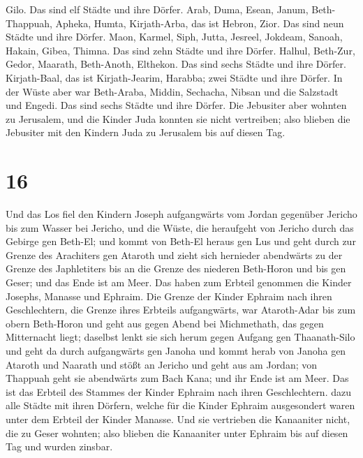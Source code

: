 Gilo. Das sind elf Städte und ihre Dörfer.  Arab, Duma,
Esean,  Janum, Beth-Thappuah, Apheka,  Humta,
Kirjath-Arba, das ist Hebron, Zior. Das sind neun Städte und ihre
Dörfer.  Maon, Karmel, Siph, Jutta,  Jesreel,
Jokdeam, Sanoah,  Hakain, Gibea, Thimna. Das sind zehn
Städte und ihre Dörfer.  Halhul, Beth-Zur, Gedor,
 Maarath, Beth-Anoth, Elthekon. Das sind sechs Städte und
ihre Dörfer.  Kirjath-Baal, das ist Kirjath-Jearim,
Harabba; zwei Städte und ihre Dörfer.  In der Wüste aber
war Beth-Araba, Middin, Sechacha,  Nibsan und die Salzstadt
und Engedi. Das sind sechs Städte und ihre Dörfer.  Die
Jebusiter aber wohnten zu Jerusalem, und die Kinder Juda konnten sie
nicht vertreiben; also blieben die Jebusiter mit den Kindern Juda zu
Jerusalem bis auf diesen Tag.

\hypertarget{section-15}{%
\section{16}\label{section-15}}

 Und das Los fiel den Kindern Joseph aufgangwärts vom Jordan
gegenüber Jericho bis zum Wasser bei Jericho, und die Wüste, die
heraufgeht von Jericho durch das Gebirge gen Beth-El;  und
kommt von Beth-El heraus gen Lus und geht durch zur Grenze des
Arachiters gen Ataroth  und zieht sich hernieder abendwärts
zu der Grenze des Japhletiters bis an die Grenze des niederen Beth-Horon
und bis gen Geser; und das Ende ist am Meer.  Das haben zum
Erbteil genommen die Kinder Josephs, Manasse und Ephraim. 
Die Grenze der Kinder Ephraim nach ihren Geschlechtern, die Grenze ihres
Erbteils aufgangwärts, war Ataroth-Adar bis zum obern Beth-Horon
 und geht aus gegen Abend bei Michmethath, das gegen
Mitternacht liegt; daselbst lenkt sie sich herum gegen Aufgang gen
Thaanath-Silo und geht da durch aufgangwärts gen Janoha  und
kommt herab von Janoha gen Ataroth und Naarath und stößt an Jericho und
geht aus am Jordan;  von Thappuah geht sie abendwärts zum
Bach Kana; und ihr Ende ist am Meer. Das ist das Erbteil des Stammes der
Kinder Ephraim nach ihren Geschlechtern.  dazu alle Städte
mit ihren Dörfern, welche für die Kinder Ephraim ausgesondert waren
unter dem Erbteil der Kinder Manasse.  Und sie vertrieben
die Kanaaniter nicht, die zu Geser wohnten; also blieben die Kanaaniter
unter Ephraim bis auf diesen Tag und wurden zinsbar.

